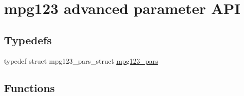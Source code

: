 \hypertarget{group__mpg123__advpar}{}\section{mpg123 advanced parameter A\+PI}
\label{group__mpg123__advpar}
\subsection*{Typedefs}
\begin{DoxyCompactItemize}
\item 
typedef struct mpg123\+\_\+pars\+\_\+struct \mbox{\hyperlink{group__mpg123__advpar_ga3983578625af3bb6dc7e3b74d0cab4aa}{mpg123\+\_\+pars}}
\end{DoxyCompactItemize}
\subsection*{Functions}
